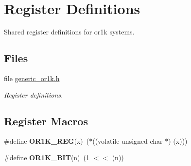 \hypertarget{group__generic__or1k__reg}{}\section{Register Definitions}
\label{group__generic__or1k__reg}


Shared register definitions for or1k systems.  


\subsection*{Files}
\begin{DoxyCompactItemize}
\item 
file \mbox{\hyperlink{generic__or1k_8h}{generic\+\_\+or1k.\+h}}
\begin{DoxyCompactList}\small\item\em Register definitions. \end{DoxyCompactList}\end{DoxyCompactItemize}
\subsection*{Register Macros}
\begin{DoxyCompactItemize}
\item 
\mbox{\label{group__generic__or1k__reg_ga4dd23fb3180034a4bed0207a010bb212}} 
\#define {\bfseries O\+R1\+K\+\_\+\+R\+EG}(x)~($\ast$((volatile unsigned char $\ast$) (x)))
\item 
\mbox{\label{group__generic__or1k__reg_gae0fc0a8807edee6753eacd144a0c93af}} 
\#define {\bfseries O\+R1\+K\+\_\+\+B\+IT}(n)~(1 $<$$<$ (n))
\end{DoxyCompactItemize}
